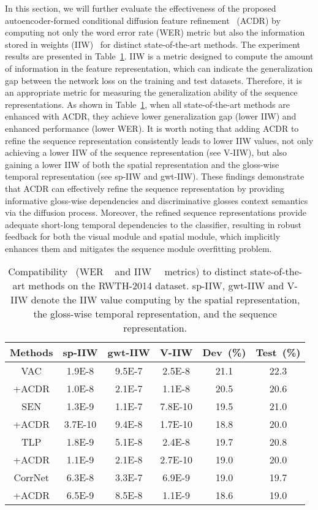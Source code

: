 \documentclass[sigconf]{acmart}
\begin{document}
In this section, we will further evaluate the effectiveness of the proposed autoencoder-formed conditional diffusion feature refinement~
(ACDR) by computing not only the word error rate (WER) metric but also the information stored in weights (IIW)~\cite{PIB2022} for distinct state-of-the-art methods. The experiment results are presented in Table~\ref{Table:sota_wer_iiw}.
IIW is a metric designed to compute the amount of information in the feature representation, which can indicate the generalization gap between the network loss on the training and test datasets. 
Therefore, it is an appropriate metric for measuring the generalization ability of the sequence representations. As shown in Table~\ref{Table:sota_wer_iiw}, when all state-of-the-art methods are enhanced with ACDR, they achieve lower generalization gap (lower IIW) and enhanced performance (lower WER).
It is worth noting that adding ACDR to refine the sequence representation consistently leads to lower IIW values, not only achieving a lower IIW of the sequence representation (see V-IIW), but also gaining a lower IIW of both the spatial representation and the gloss-wise temporal representation (see sp-IIW and gwt-IIW). 
These findings demonstrate that ACDR can effectively refine the sequence representation by providing informative gloss-wise dependencies and discriminative glosses context semantics via the diffusion process. Moreover, the refined sequence representations provide adequate short-long temporal dependencies to the classifier, resulting in robust feedback for both the visual module and spatial module, which implicitly enhances them and mitigates the sequence module overfitting problem.


\setlength{\tabcolsep}{4pt}
\begin{table}[!htbp]
\centering
\fontsize{9}{12}\selectfont
\caption{Compatibility ~(WER ~ and IIW~\cite{PIB2022}~ metrics) to distinct state-of-the-art methods on the {RWTH-2014} dataset. sp-IIW, {gwt}-IIW and V-IIW denote the IIW value computing by the spatial representation, the gloss-wise temporal representation, and the sequence representation.}
\begin{tabular}{c|c|c|c|c|c} 
\toprule
Methods & sp-IIW & {gwt}-IIW &V-IIW & Dev~(\%) & Test~(\%) \\ \midrule {VAC} & 1.9E-8 & 9.5E-7 & 2.5E-8 & 21.1 & 22.3 \\ {+ACDR} &  1.0E-8 & 2.1E-7 & 1.1E-8 & 20.5 & 20.6 \\ \midrule {SEN} & 1.3E-9 & 1.1E-7  & 7.8E-10 & 19.5 & 21.0 \\ {+ACDR} & 3.7E-10 & 9.4E-8 &1.7E-10 & 18.8 & 20.0 \\ \midrule 
        {TLP} & 1.8E-9 & 5.1E-8  & 2.4E-8 & 19.7 & 20.8 \\ {+ACDR} &1.1E-9 & 2.1E-8  & 2.7E-10 & 19.0 & 20.0 \\ \midrule 
       {CorrNet} & 6.3E-8 & 3.3E-7  & 6.9E-9 & 19.0 & 19.7 \\ {+ACDR} & 6.5E-9 & 8.5E-8 &1.1E-9 & 18.6 & 19.0 \\  


        \bottomrule
    \end{tabular}
    \label{Table:sota_wer_iiw}
\end{table}
\end{document}
